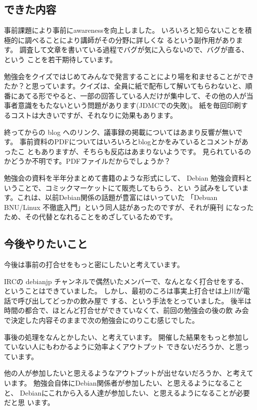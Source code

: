\documentclass[mingoth,a4paper]{jsarticle}
\begin{document}
\subsection{できた内容}

事前課題により事前にawarenessを向上しました。
いろいろと知らないことを積極的に調べることにより講師がその分野に詳しくな
るという副作用があります。
調査して文章を書いている過程でバグが気に入らないので、バグが直る、という
ことを若干期待しています。

勉強会をクイズではじめてみんなで発言することにより場を和ませることができ
たか？と思っています。クイズは、全員に紙で配布して解いてもらわないと、順
番にあてる形でやると、一部の回答している人だけが集中して、その他の人が当
事者意識をもたないという問題があります(JDMCでの失敗)。
紙を毎回印刷するコストは大きいですが、それなりに効果もあります。

終ってからの blog へのリンク、議事録の掲載についてはあまり反響が無いです。
事前資料のPDFについてはいろいろとblogとかをみているとコメントがあったこ
ともありますが、そちらも反応はあまりないようです。
見られているのかどうか不明です。PDFファイルだからでしょうか？

勉強会の資料を半年分まとめて書籍のような形式にして、
Debian 勉強会資料ということで、コミックマーケットにて販売してもらう、とい
う試みをしています。これは、以前Debian関係の話題が豊富にはいっていた
「Debuan BNU/Linux 不徹底入門」という同人誌があったのですが、それが廃刊
になったため、その代替となれることをめざしているためです。

\subsection{今後やりたいこと}

今後は事前の打合せをもっと密にしたいと考えています。

IRCの debianjp チャンネルで偶然いたメンバーで、なんとなく打合せをする、
ということはできていました。
しかし、最初のころは事実上打合せは上川が電話で呼び出してどっかの飲み屋で
する、という手法をとっていました。
後半は時間の都合で、ほとんど打合せができていなくて、前回の勉強会の後の飲
み会で決定した内容そのままで次の勉強会にのりこむ感じでした。

事後の処理をなんとかしたい、と考えています。
開催した結果をもっと参加していない人にもわかるように効率よくアウトプット
できないだろうか、と思っています。

他の人が参加したいと思えるようなアウトプットが出せないだろうか、と考えて
います。
勉強会自体にDebian関係者が参加したい、と思えるようになることと、
Debianにこれから入る人達が参加したい、と思えるようになることが必要だと思
います。
\end{document}
